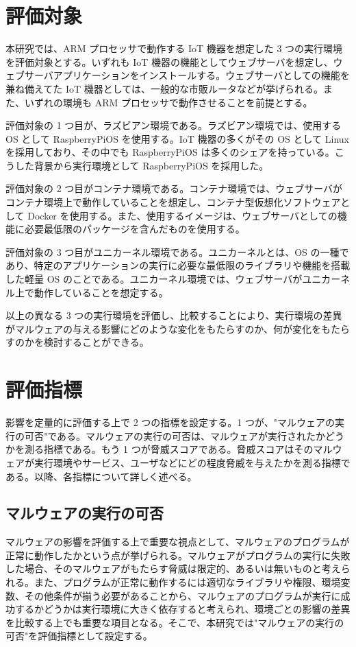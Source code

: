 \documentclass[12pt,a4paper,titlepage,report]{jsbook}
\begin{document}
\section{評価対象}
本研究では、ARM プロセッサで動作する IoT 機器を想定した 3 つの実行環境を評価対象とする。いずれも IoT 機器の機能としてウェブサーバを想定し、ウェブサーバアプリケーションをインストールする。ウェブサーバとしての機能を兼ね備えてた IoT 機器としては、一般的な市販ルータなどが挙げられる。また、いずれの環境も ARM プロセッサで動作させることを前提とする。

評価対象の 1 つ目が、ラズビアン環境である。ラズビアン環境では、使用する OS として RaspberryPiOS を使用する。IoT 機器の多くがその OS として Linux を採用しており、その中でも RaspberryPiOS は多くのシェアを持っている\*。こうした背景から実行環境として RaspberryPiOS を採用した。

評価対象の 2 つ目がコンテナ環境である。コンテナ環境では、ウェブサーバがコンテナ環境上で動作していることを想定し、コンテナ型仮想化ソフトウェアとして Docker を使用する。また、使用するイメージは、ウェブサーバとしての機能に必要最低限のパッケージを含んだものを使用する。

評価対象の 3 つ目がユニカーネル環境である。ユニカーネルとは、OS の一種であり、特定のアプリケーションの実行に必要な最低限のライブラリや機能を搭載した軽量 OS のことである。ユニカーネル環境では、ウェブサーバがユニカーネル上で動作していることを想定する。

以上の異なる 3 つの実行環境を評価し、比較することにより、実行環境の差異がマルウェアの与える影響にどのような変化をもたらすのか、何が変化をもたらすのかを検討することができる。

\section{評価指標}
影響を定量的に評価する上で 2 つの指標を設定する。1 つが、"マルウェアの実行の可否"である。マルウェアの実行の可否は、マルウェアが実行されたかどうかを測る指標である。もう 1 つが脅威スコアである。脅威スコアはそのマルウェアが実行環境やサービス、ユーザなどにどの程度脅威を与えたかを測る指標である。以降、各指標について詳しく述べる。

\subsection{マルウェアの実行の可否}
マルウェアの影響を評価する上で重要な視点として、マルウェアのプログラムが正常に動作したかという点が挙げられる。マルウェアがプログラムの実行に失敗した場合、そのマルウェアがもたらす脅威は限定的、あるいは無いものと考えられる。また、プログラムが正常に動作するには適切なライブラリや権限、環境変数、その他条件が揃う必要があることから、マルウェアのプログラムが実行に成功するかどうかは実行環境に大きく依存すると考えられ、環境ごとの影響の差異を比較する上でも重要な項目となる。そこで、本研究では"マルウェアの実行の可否"を評価指標として設定する。
\end{document}
